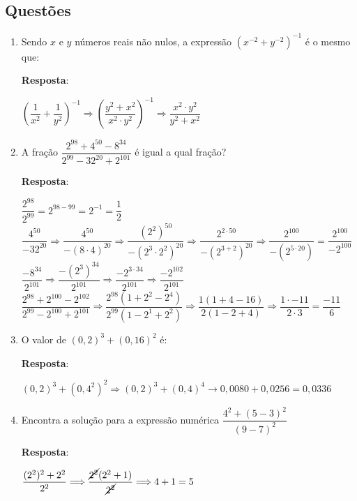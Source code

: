 \subsection{Questões}
\begin{enumerate}[label=\alph*)]
	\item Sendo $ x $ e $ y $ números reais não nulos, a expressão $ (x^{-2} + y^{-2})^{-1} $ é o mesmo que:

	\indent \indent \textbf{Resposta}:
	
	\indent \indent $ (\dfrac{1}{x^{2}} + \dfrac{1}{y^{2}})^{-1} \Longrightarrow (\dfrac{y^{2} + x^{2}}{x^{2}\cdot y^{2}})^{-1} \Longrightarrow \dfrac{x^{2} \cdot y^{2}}{y^{2} + x^{2}} $
	
	\item A fração $ \dfrac{2^{98} + 4^{50} - 8^{34}}{2^{99} - 32^{20} + 2^{101}} $ é igual a qual fração?
	
	\indent \indent \textbf{Resposta}:
	
	\indent \indent $ \dfrac{2^{98}}{2^{99}} = 2^{98 - 99} = 2^{-1} = \dfrac{1}{2} $ \\

	\indent \indent $ \dfrac{4^{50}}{-32^{20}} \Longrightarrow \dfrac{4^{50}}{-(8\cdot 4)^{20}} \Longrightarrow \dfrac{(2^{2})^{50}}{-(2^{3}\cdot 2^{2})^{20}} \Longrightarrow \dfrac{2^{2\cdot 50}}{-(2^{3 + 2})^{20}} \Longrightarrow \dfrac{2^{100}}{-(2^{5\cdot 20})} = \dfrac{2^{100}}{-2^{100}} $ \\
	
	\indent \indent $ \dfrac{-8^{34}}{2^{101}} \Longrightarrow \dfrac{-(2^{3})^{34}}{2^{101}} \Longrightarrow \dfrac{-2^{3\cdot 34}}{2^{101}} \Longrightarrow \dfrac{-2^{102}}{2^{101}} $ \\
	
	\indent \indent $ \dfrac{2^{98} + 2^{100} - 2^{102}}{2^{99} - 2^{100} + 2^{101}} \Longrightarrow \dfrac{2^{98}(1 + 2^{2} - 2^{4})}{2^{99}(1 - 2^{1} + 2^{2})} \Longrightarrow \dfrac{1(1 + 4 - 16)}{2(1 - 2 + 4)} \Longrightarrow \dfrac{1 \cdot -11}{2\cdot 3} = \dfrac{-11}{6}  $
	
	\item O valor de $ (0,2)^{3} + (0,16)^{2} $ é:
	
	\indent \indent \textbf{Resposta}:
	
	\indent \indent $ (0,2)^{3} + (0,4^{2})^{2} \Longrightarrow (0,2)^{3} + (0,4)^{4} \longrightarrow 0,0080 + 0,0256 = 0,0336 $
	
	\item Encontra a solução para a expressão numérica $ \dfrac{4^{2} + (5 - 3)^{2}}{(9 - 7)^{2}} $
	
	\indent \indent \textbf{Resposta}:
	
	\indent \indent $ \dfrac{(2^{2})^{2} + 2 ^{2}}{2^{2}} \Longrightarrow \dfrac{\cancel{2^{2}}(2^{2} + 1)}{\cancel{2^{2}}} \Longrightarrow 4 + 1 = 5 $

\end{enumerate}
	
